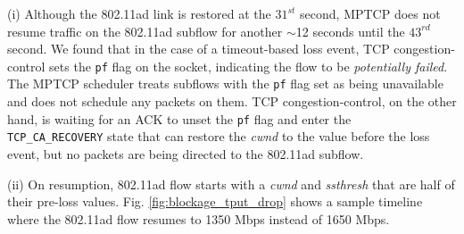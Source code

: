 \noindent(i) Although the 802.11ad link is restored at the $31^{st}$
second, MPTCP does not resume traffic on the 802.11ad subflow for
another $\sim$12 seconds until the $43^{rd}$ second. We found that in
the case of a timeout-based loss event, TCP congestion-control sets
the {\tt pf} flag on the socket, indicating the flow to be
\emph{potentially failed}. The MPTCP scheduler treats subflows with
the {\tt pf} flag set as being unavailable and does not schedule any
packets on them. TCP congestion-control, on the other hand, is waiting
for an ACK to unset the {\tt pf} flag and enter the {\tt
  TCP\_CA\_RECOVERY} state that can restore the \emph{cwnd} to the
value before the loss event, but no packets are being directed to
the 802.11ad subflow.

\noindent(ii) On
resumption, 802.11ad flow starts with a \emph{cwnd} and
\emph{ssthresh} that are half of their pre-loss
values. Fig. \ref{fig:blockage_tput_drop} shows a sample timeline
where the 802.11ad flow resumes to 1350 Mbps instead of 1650
Mbps. 
